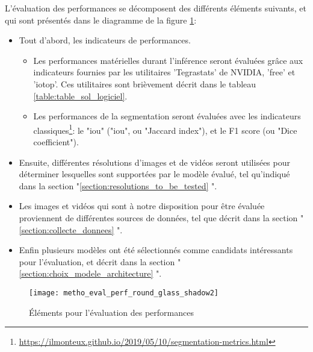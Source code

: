 ﻿L’évaluation des performances se décomposent des différents éléments suivants, et qui sont présentés dans le diagramme de la figure \ref{fig:metho_eval}: 
\begin{itemize}
    \item Tout d'abord, les indicateurs de performances.
    \begin{itemize}
        \item Les performances matérielles durant l'inférence seront évaluées grâce aux indicateurs fournies par les utilitaires 'Tegrastats' de NVIDIA, 'free' et 'iotop'. Ces utilitaires sont brièvement décrit dans le tableau \ref{table:table_sol_logiciel}.
        \item Les performances de la segmentation seront évaluées avec les indicateurs classiques\footnote{\url{https://ilmonteux.github.io/2019/05/10/segmentation-metrics.html}}: le "\acrshort{iou}" ("\acrlong{iou}", ou "Jaccard index"), et le F1 score (ou "Dice coefficient").
    \end{itemize}
    \item Ensuite, différentes résolutions d'images et de vidéos seront utilisées pour déterminer lesquelles sont supportées par le modèle évalué, tel qu'indiqué dans la section "\ref{section:resolutions_to_be_tested} ". 
    \item Les images et vidéos qui sont à notre disposition pour être évaluée proviennent de différentes sources de données, tel que décrit dans la section "\ref{section:collecte_donnees} ". 
    \item Enfin plusieurs modèles ont été sélectionnés comme candidats intéressants pour l'évaluation, et décrit dans la section "\ref{section:choix_modele_architecture} ".
\end{itemize} 
\label{metho_eval}
\begin{figure}[H]
    \centering
    \texttt{[image: metho\_eval\_perf\_round\_glass\_shadow2]}
    \caption{Éléments pour l'évaluation des performances}
    \label{fig:metho_eval}
\end{figure}
